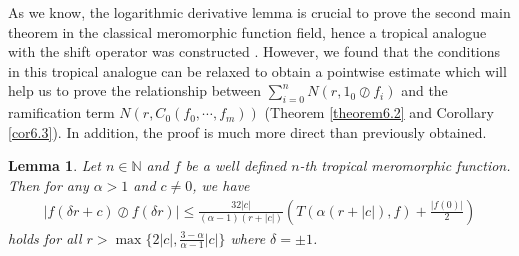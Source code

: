 \documentclass{article}
\newtheorem{lemma}[defin]{Lemma}
\begin{document}
As we know, the logarithmic derivative lemma is crucial to prove the second main theorem in the classical meromorphic function field, hence a tropical analogue with the shift operator was constructed \cite{Tnt, Rbook, Pro}. However, we found that the conditions in this tropical analogue can be relaxed to obtain a pointwise estimate which will help us to prove the relationship between $\sum_{i=0}^{n}N(r, 1_{0}\oslash f_{i})$ and the ramification term $N(r, C_{0}(f_{0}, \cdots, f_{m}))$ (Theorem \ref{theorem6.2} and Corollary \ref{cor6.3}). In addition, the proof is much more direct than previously obtained.
\begin{lemma}\label{lemma4.4}
    Let $n\in\mathbb{N}$ and $f$ be a well defined $n$-th tropical meromorphic function. Then for any $\alpha>1$ and $c\neq 0$, we have
    \begin{eqnarray}\label{4lp}
        \left|f(\delta r+c)\oslash f(\delta r)\right|\leq \frac{32|c|}{(\alpha-1)(r+|c|)}\left(T(\alpha(r+|c|), f)+\frac{|f(0)|}{2}\right)
    \end{eqnarray}
    holds for all $r>\max\{2|c|, \frac{3-\alpha}{\alpha-1}|c|\}$ where $\delta=\pm 1$.
\end{lemma}
\end{document}
